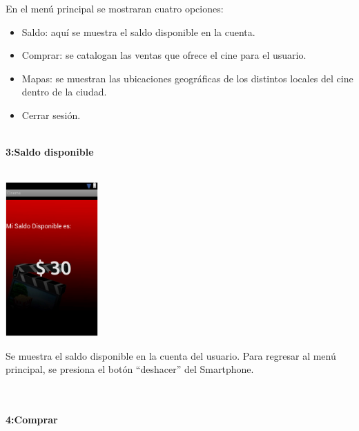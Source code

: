 \documentclass[20pt]{article}
\begin{document}
En el menú principal se mostraran cuatro opciones: 

\begin{itemize}
	\item Saldo: aquí se muestra el saldo disponible en la cuenta.
	\item Comprar: se catalogan las ventas que ofrece el cine para el usuario.
	\item Mapas: se muestran las ubicaciones geográficas de los distintos locales del cine dentro de la ciudad.
	\item Cerrar sesión.\\\\
\end{itemize}



\begin{large}
	\textbf{3:Saldo disponible}\\\
\end{large}
\begin{center}
	\includegraphics[totalheight=1.8in,width=1.4in]{saldo_disponible}
\end{center}
Se muestra el saldo disponible en la cuenta del usuario.
Para regresar al menú principal, se presiona el botón “deshacer” del Smartphone.\\\\\\

\begin{large}
	\textbf{4:Comprar}\\\
\end{large}
\end{document}
